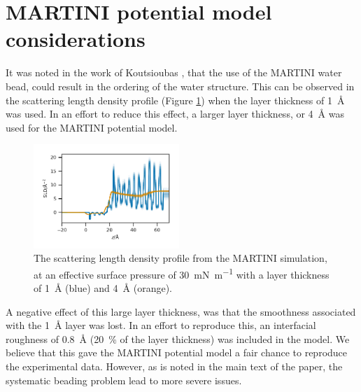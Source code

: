 \documentclass[amsmath,amssymb,superscriptaddress]{revtex4-1}
\begin{document}
\section{MARTINI potential model considerations}
It was noted in the work of Koutsioubas \cite{koutsioubas_combined_2016}, that the use of the MARTINI water bead, could result in the ordering of the water structure.
This can be observed in the scattering length density profile (Figure \ref{fig:mart}) when the layer thickness of \SI{1}{\angstrom} was used.
In an effort to reduce this effect, a larger layer thickness, or \SI{4}{\angstrom} was used for the MARTINI potential model.
%
\begin{figure}
 \centering
 \includegraphics[width=0.49\textwidth]{martiniorder}
 \caption{The scattering length density profile from the MARTINI simulation, at an effective surface pressure of \SI{30}{\milli\newton\per\meter} with a layer thickness of \SI{1}{\angstrom} (blue) and \SI{4}{\angstrom} (orange). }
 \label{fig:mart}
\end{figure}
%

A negative effect of this large layer thickness, was that the smoothness associated with the \SI{1}{\angstrom} layer was lost.
In an effort to reproduce this, an interfacial roughness of \SI{0.8}{\angstrom} (\SI{20}{\percent} of the layer thickness) was included in the model.
We believe that this gave the MARTINI potential model a fair chance to reproduce the experimental data.
However, as is noted in the main text of the paper, the systematic beading problem lead to more severe issues.
\end{document}
